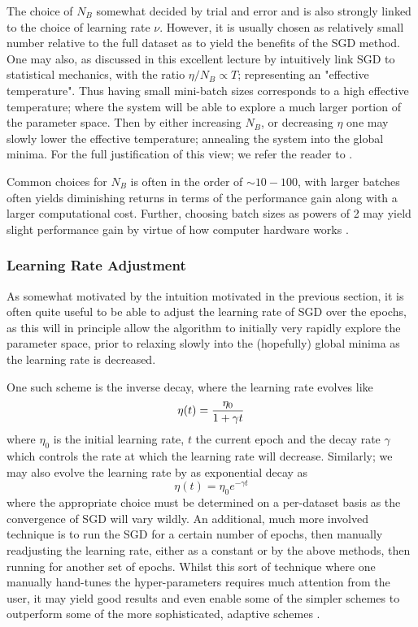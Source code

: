 \documentclass[reprint, english, nofootinbib]{revtex4-2}
\begin{document}
The choice of $N_{B}$ somewhat decided by trial and error and is also strongly linked to the choice of learning rate $\nu$. However, it is usually chosen as relatively small number relative to the full dataset as to yield the benefits of the SGD method. One may also, as discussed in this excellent lecture by \textcite{ManyBodyML} intuitively link SGD to statistical mechanics, with the ratio $\eta / N_{B} \propto T$; representing an "effective temperature". Thus having small mini-batch sizes corresponds to a high effective temperature; where the system will be able to explore a much larger portion of the parameter space. Then by either increasing $N_B$, or decreasing $\eta$ one may slowly lower the effective temperature; annealing the system into the global minima. For the full justification of this view; we refer the reader to \textcite{ManyBodyML}.

Common choices for $N_B$ is often in the order of $\sim 10-100$, with larger batches often yields diminishing returns in terms of the performance gain along with a larger computational cost. Further, choosing batch sizes as powers of 2 may yield slight performance gain by virtue of how computer hardware works \cite{Aggarwall}.

\subsubsection{Learning Rate Adjustment}
\noindent
As somewhat motivated by the intuition motivated in the previous section, it is often quite useful to be able to adjust the learning rate of SGD over the epochs, as this will in principle allow the algorithm to initially very rapidly explore the parameter space, prior to relaxing slowly into the (hopefully) global minima as the learning rate is decreased.

One such scheme is the inverse decay, where the learning rate evolves like
\begin{equation}
    \eta\qty(t) = \frac{\eta_0}{1 + \gamma t}
\end{equation}
where $\eta_0$ is the initial learning rate, $t$ the current epoch and the decay rate $\gamma$ which controls the rate at which the learning rate will decrease. Similarly; we may also evolve the learning rate by as exponential decay as
\begin{equation}
    \eta(t) = \eta_0 e^{-\gamma t}
\end{equation}
where the appropriate choice must be determined on a per-dataset basis as the convergence of SGD will vary wildly. An additional, much more involved technique is to run the SGD for a certain number of epochs, then manually readjusting the learning rate, either as a constant or by the above methods, then running for another set of epochs. Whilst this sort of technique where one manually hand-tunes the hyper-parameters requires much attention from the user, it may yield good results and even enable some of the simpler schemes to outperform some of the more sophisticated, adaptive schemes \cite{zhang2018yellowfin}.
\end{document}
